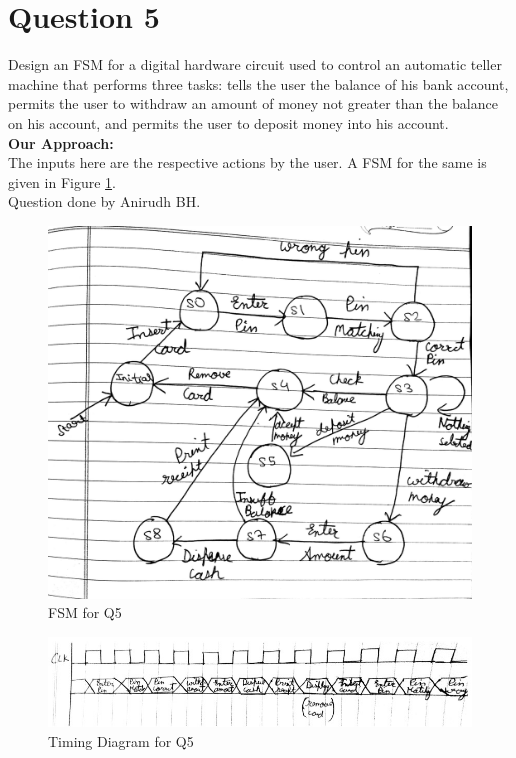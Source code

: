 \documentclass[11pt,a4paper]{article}
\begin{document}
	\section*{Question 5}
	Design an FSM for a digital hardware circuit used to control an automatic teller machine that performs three tasks: tells the user the balance of his bank account, permits the user to withdraw an amount of money not greater than the balance on his account, and permits the user to deposit money into his account.
	\\
	\textbf{Our Approach:}\\
	The inputs here are the respective actions by the user. A FSM for the same is given in Figure \ref{fig:q5fsm}. \\
	Question done by Anirudh BH.
	
	\begin{figure}[H]
		\centering
		\includegraphics[scale=0.12]{images/q5fsm}
		\caption[]{FSM for Q5}
		\label{fig:q5fsm}
	\end{figure}

	\begin{figure}[H]
		\centering
		\includegraphics[width=1\linewidth]{images/q5timing}
		\caption[]{Timing Diagram for Q5}
		\label{fig:q5timing}
	\end{figure}
\end{document}
